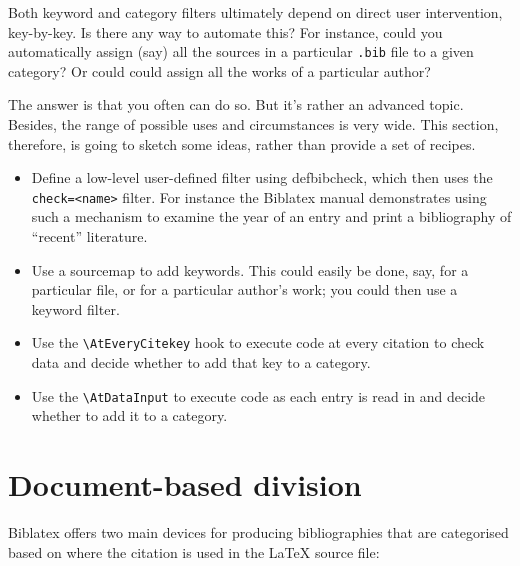 Both keyword and category filters ultimately depend on direct user
intervention, key-by-key. Is there any way to automate this? For
instance, could you automatically assign (say) all the sources in a
particular \texttt{.bib} file to a given category? Or could could
assign all the works of a particular author?

The answer is that you often can do so. But it's rather an advanced
topic. Besides, the range of possible uses and circumstances is very
wide. This section, therefore, is going to sketch some ideas, rather
than provide a set of recipes.

\begin{itemize}
\item Define a low-level user-defined filter using defbibcheck, which
  then uses the \texttt{check=\textless{}name\textgreater{}}
  filter. For instance the Biblatex manual demonstrates using such a
  mechanism to examine the year of an entry and print a bibliography
  of ``recent'' literature.
\item Use a sourcemap to add keywords. This could easily be done, say,
  for a particular file, or for a particular author's work; you could
  then use a keyword filter.
\item Use the \texttt{\textbackslash{}AtEveryCitekey} hook to execute
  code at every citation to check data and decide whether to add that
  key to a category.
\item Use the \texttt{\textbackslash{}AtDataInput} to execute code as
  each entry is read in and decide whether to add it to a category.
\end{itemize}

\section{Document-based division}

Biblatex offers two main devices for producing bibliographies that are
categorised based on where the citation is used in the LaTeX source
file:

